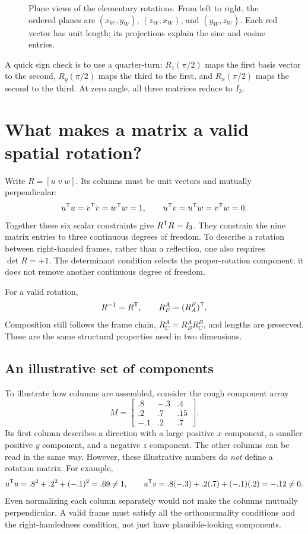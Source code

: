 \begin{figure}[htbp]
\centering
\caption{Plane views of the elementary rotations. From left to right, the
ordered planes are $(x_W,y_W)$, $(z_W,x_W)$, and $(y_W,z_W)$. Each red
vector has unit length; its projections explain the sine and cosine entries.}
\label{fig:l04-planes}
\end{figure}

A quick sign check is to use a quarter-turn: $R_z(\pi/2)$ maps the first
basis vector to the second, $R_y(\pi/2)$ maps the third to the first, and
$R_x(\pi/2)$ maps the second to the third. At zero angle, all three matrices
reduce to $I_3$.

\section{What makes a matrix a valid spatial rotation?}
Write $R=[u\;v\;w]$. Its columns must be unit vectors and mutually
perpendicular:
\begin{equation}
 u^{\mathsf T} u=v^{\mathsf T} v=w^{\mathsf T} w=1,\qquad
 u^{\mathsf T} v=u^{\mathsf T} w=v^{\mathsf T} w=0.
 \label{eq:l04-constraints}
\end{equation}
Together these six scalar constraints give $R^{\mathsf T} R=I_3$. They constrain
the nine matrix entries to three continuous degrees of freedom. To describe
a rotation between right-handed frames, rather than a reflection, one also
requires $\det R=+1$. The determinant condition selects the proper-rotation
component; it does not remove another continuous degree of freedom.

For a valid rotation,
\begin{equation}
 R^{-1}=R^{\mathsf T},\qquad R_F^A=(R_A^F)^{\mathsf T}.
\end{equation}
Composition still follows the frame chain, $R_C^A=R_B^A R_C^B$, and lengths
are preserved. These are the same structural properties used in two dimensions.

\subsection{An illustrative set of components}
To illustrate how columns are assembled, consider the rough component array
\begin{equation}
 M=\begin{bmatrix}.8&-.3&.4\\.2&.7&.15\\-.1&.2&.7\end{bmatrix}.
 \label{eq:l04-rough}
\end{equation}
Its first column describes a direction with a large positive $x$ component,
a smaller positive $y$ component, and a negative $z$ component. The other
columns can be read in the same way. However, these illustrative numbers do
\emph{not} define a rotation matrix. For example,
\[
 u^{\mathsf T} u=.8^2+.2^2+(-.1)^2=.69\ne1,\qquad
 u^{\mathsf T} v=.8(-.3)+.2(.7)+(-.1)(.2)=-.12\ne0.
\]
Even normalizing each column separately would not make the columns mutually
perpendicular. A valid frame must satisfy all the orthonormality conditions
and the right-handedness condition, not just have plausible-looking components.

